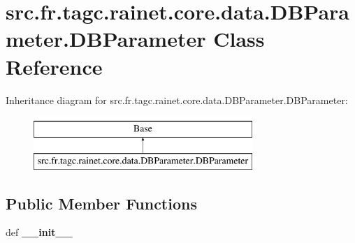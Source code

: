 \hypertarget{classsrc_1_1fr_1_1tagc_1_1rainet_1_1core_1_1data_1_1DBParameter_1_1DBParameter}{\section{src.\-fr.\-tagc.\-rainet.\-core.\-data.\-D\-B\-Parameter.\-D\-B\-Parameter Class Reference}
\label{classsrc_1_1fr_1_1tagc_1_1rainet_1_1core_1_1data_1_1DBParameter_1_1DBParameter}
}
Inheritance diagram for src.\-fr.\-tagc.\-rainet.\-core.\-data.\-D\-B\-Parameter.\-D\-B\-Parameter\-:\begin{figure}[H]
\begin{center}
\leavevmode
\includegraphics[height=2.000000cm]{classsrc_1_1fr_1_1tagc_1_1rainet_1_1core_1_1data_1_1DBParameter_1_1DBParameter}
\end{center}
\end{figure}
\subsection*{Public Member Functions}
\begin{DoxyCompactItemize}
\item 
\hypertarget{classsrc_1_1fr_1_1tagc_1_1rainet_1_1core_1_1data_1_1DBParameter_1_1DBParameter_ab8103a8f98dde9ad59b079e98e736f2b}{def {\bfseries \-\_\-\-\_\-init\-\_\-\-\_\-}}\label{classsrc_1_1fr_1_1tagc_1_1rainet_1_1core_1_1data_1_1DBParameter_1_1DBParameter_ab8103a8f98dde9ad59b079e98e736f2b}

\end{DoxyCompactItemize}
